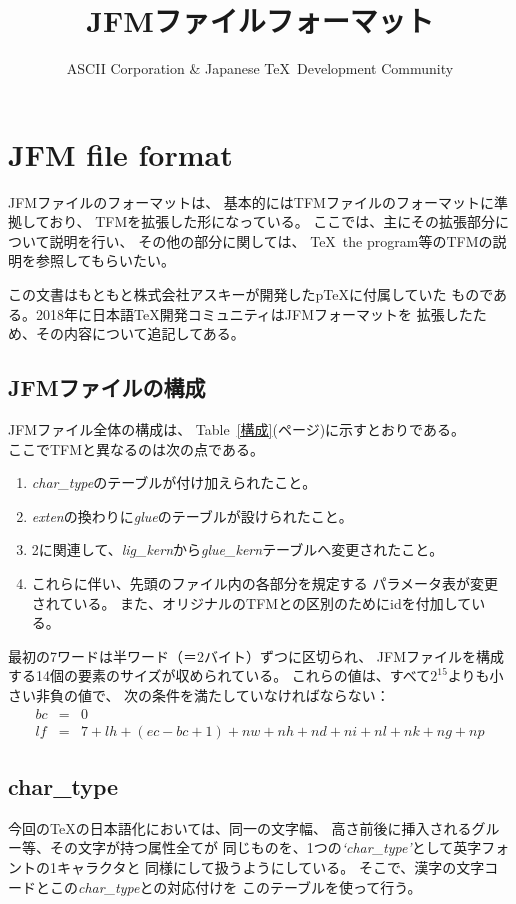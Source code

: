 \documentclass[twoside]{jarticle}
\title{JFMファイルフォーマット}
\author{ASCII Corporation \& Japanese \TeX\ Development Community}
\begin{document}
\maketitle

\section{JFM file format}
JFMファイルのフォーマットは、
基本的にはTFMファイルのフォーマットに準拠しており、
TFMを拡張した形になっている。
ここでは、主にその拡張部分について説明を行い、
その他の部分に関しては、
\TeX\ the program等のTFMの説明を参照してもらいたい。

この文書はもともと株式会社アスキーが開発したp\TeX{}に付属していた
ものである。2018年に日本語\TeX{}開発コミュニティはJFMフォーマットを
拡張したため、その内容について追記してある。

\subsection{JFMファイルの構成}
JFMファイル全体の構成は、
Table~\ref{構成}(\pageref{構成}ページ)に示すとおりである。 \\
ここでTFMと異なるのは次の点である。
\begin{enumerate}
\item {\it char\_type}のテーブルが付け加えられたこと。
\item {\it exten}の換わりに{\it glue}のテーブルが設けられたこと。
\item 2に関連して、{\it lig\_kern}から{\it glue\_kern}テーブルへ変更されたこと。
\item これらに伴い、先頭のファイル内の各部分を規定する
	パラメータ表が変更されている。
	また、オリジナルのTFMとの区別のためにidを付加している。
\end{enumerate}
最初の7ワードは半ワード（＝2バイト）ずつに区切られ、
JFMファイルを構成する14個の要素のサイズが収められている。
これらの値は、すべて$2^{15}$よりも小さい非負の値で、
次の条件を満たしていなければならない：
\begin{eqnarray*}
bc &=& 0 \\
lf &=& 7 + lh + (ec - bc + 1) + nw + nh + nd + ni + nl + nk + ng + np
\end{eqnarray*}

\subsection{char\_type}
今回の\TeX の日本語化においては、同一の文字幅、
高さ前後に挿入されるグルー等、その文字が持つ属性全てが
同じものを、1つの{\it `char\_type'}として英字フォントの1キャラクタと
同様にして扱うようにしている。
そこで、漢字の文字コードとこの{\it char\_type}との対応付けを
このテーブルを使って行う。
\end{document}
